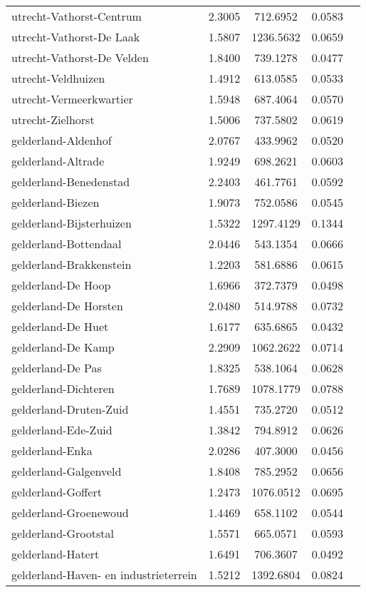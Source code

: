 \begin{longtable}{llccc}
utrecht-Vathorst-Centrum & 2.3005 & 712.6952 & 0.0583 \\
utrecht-Vathorst-De Laak & 1.5807 & 1236.5632 & 0.0659 \\
utrecht-Vathorst-De Velden & 1.8400 & 739.1278 & 0.0477 \\
utrecht-Veldhuizen & 1.4912 & 613.0585 & 0.0533 \\
utrecht-Vermeerkwartier & 1.5948 & 687.4064 & 0.0570 \\
utrecht-Zielhorst & 1.5006 & 737.5802 & 0.0619 \\
gelderland-Aldenhof & 2.0767 & 433.9962 & 0.0520 \\
gelderland-Altrade & 1.9249 & 698.2621 & 0.0603 \\
gelderland-Benedenstad & 2.2403 & 461.7761 & 0.0592 \\
gelderland-Biezen & 1.9073 & 752.0586 & 0.0545 \\
gelderland-Bijsterhuizen & 1.5322 & 1297.4129 & 0.1344 \\
gelderland-Bottendaal & 2.0446 & 543.1354 & 0.0666 \\
gelderland-Brakkenstein & 1.2203 & 581.6886 & 0.0615 \\
gelderland-De Hoop & 1.6966 & 372.7379 & 0.0498 \\
gelderland-De Horsten & 2.0480 & 514.9788 & 0.0732 \\
gelderland-De Huet & 1.6177 & 635.6865 & 0.0432 \\
gelderland-De Kamp & 2.2909 & 1062.2622 & 0.0714 \\
gelderland-De Pas & 1.8325 & 538.1064 & 0.0628 \\
gelderland-Dichteren & 1.7689 & 1078.1779 & 0.0788 \\
gelderland-Druten-Zuid & 1.4551 & 735.2720 & 0.0512 \\
gelderland-Ede-Zuid & 1.3842 & 794.8912 & 0.0626 \\
gelderland-Enka & 2.0286 & 407.3000 & 0.0456 \\
gelderland-Galgenveld & 1.8408 & 785.2952 & 0.0656 \\
gelderland-Goffert & 1.2473 & 1076.0512 & 0.0695 \\
gelderland-Groenewoud & 1.4469 & 658.1102 & 0.0544 \\
gelderland-Grootstal & 1.5571 & 665.0571 & 0.0593 \\
gelderland-Hatert & 1.6491 & 706.3607 & 0.0492 \\
gelderland-Haven- en industrieterrein & 1.5212 & 1392.6804 & 0.0824 \\

\end{longtable}
